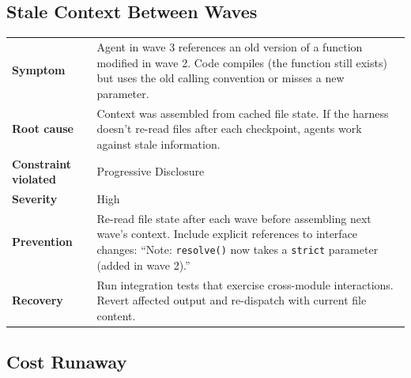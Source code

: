 \documentclass[
  a4paper,
  DIV=11,
  numbers=noendperiod]{scrreprt}
\newcounter{none} %
\begin{document}
\subsection{Stale Context Between
Waves}\label{stale-context-between-waves}

{\def\LTcaptype{none} %
\begin{longtable}[]{@{}
  >{\raggedright\arraybackslash}p{}
  >{\raggedright\arraybackslash}p{}@{}}
\toprule\noalign{}
\endhead
\bottomrule\noalign{}
\endlastfoot
\textbf{Symptom} & Agent in wave 3 references an old version of a
function modified in wave 2. Code compiles (the function still exists)
but uses the old calling convention or misses a new parameter. \\
\textbf{Root cause} & Context was assembled from cached file state. If
the harness doesn't re-read files after each checkpoint, agents work
against stale information. \\
\textbf{Constraint violated} & Progressive Disclosure \\
\textbf{Severity} & High \\
\textbf{Prevention} & Re-read file state after each wave before
assembling next wave's context. Include explicit references to interface
changes: ``Note: \texttt{resolve()} now takes a \texttt{strict}
parameter (added in wave 2).'' \\
\textbf{Recovery} & Run integration tests that exercise cross-module
interactions. Revert affected output and re-dispatch with current file
content. \\
\end{longtable}
}

\subsection{Cost Runaway}\label{cost-runaway}
\end{document}
